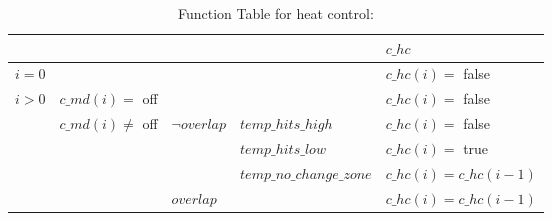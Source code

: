 \documentclass[fontsize=12pt,paper=letter,twoside]{scrartcl}
\begin{document}
\begin{table}[]
\centering
\begin{tabular}{llll|l|}
\cline{5-5}
                                                        &                                                       &                                                                        &                        & $c\_hc$                 \\ \hline
\multicolumn{4}{|l|}{$i = 0$}                                                                                                                                                                                       & $c\_hc(i) =$ false      \\ \hline
\multicolumn{1}{|l|}{\multirow{5}{*}{$i > 0$}} & \multicolumn{3}{l|}{$c\_md(i) =$ off}                                                                                                                     & $c\_hc(i) =$ false      \\ \cline{2-5}
\multicolumn{1}{|l|}{}                                  & \multicolumn{1}{l|}{\multirow{4}{*}{$c\_md(i) \not =$ off}} & \multicolumn{1}{l|}{\multirow{3}{*}{$\neg overlap$ \footnotemark}} & $temp\_hits\_high$ \footnotemark      & $c\_hc(i) =$ false      \\ \cline{4-5}
\multicolumn{1}{|l|}{}                                  & \multicolumn{1}{l|}{}                                 & \multicolumn{1}{l|}{}                                                  & $temp\_hits\_low$ \footnotemark       & $c\_hc(i) =$ true       \\ \cline{4-5}
\multicolumn{1}{|l|}{}                                  & \multicolumn{1}{l|}{}                                 & \multicolumn{1}{l|}{}                                                  & $temp\_no\_change\_zone$ \footnotemark & $c\_hc(i) = c\_hc(i-1)$ \\ \cline{3-5}
\multicolumn{1}{|l|}{}                                  & \multicolumn{1}{l|}{}                                 & \multicolumn{2}{l|}{$overlap$}                                               & $c\_hc(i) = c\_hc(i-1)$ \\ \hline
\end{tabular}
\caption{Function Table for heat control: }
\label{fthcl}
\end{table}
\end{document}
